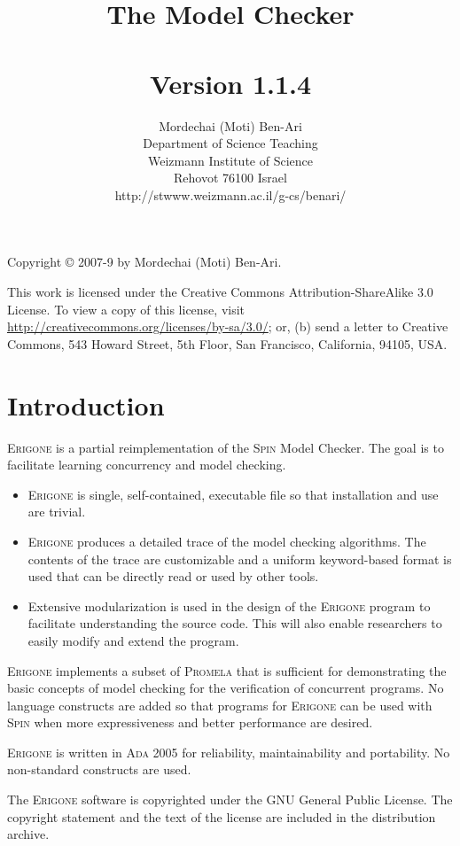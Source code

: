 \documentclass[11pt]{article}
\title{The \prg{} Model Checker\\\mbox{}\\\large{Version 1.1.4}}
\author{Mordechai (Moti) Ben-Ari\\
Department of Science Teaching\\
Weizmann Institute of Science\\
Rehovot 76100 Israel\\
\textsf{http://stwww.weizmann.ac.il/g-cs/benari/}}
\newcommand*{\prg}{\textsc{Erigone}}
\newcommand*{\spn}{\textsc{Spin}}
\newcommand*{\prm}{\textsc{Promela}}
\newcommand*{\ada}{\textsc{Ada 2005}}
\begin{document}
\maketitle
\thispagestyle{empty}

\vfill

\begin{center}
Copyright \copyright{} 2007-9 by Mordechai (Moti) Ben-Ari.
\end{center}
This work is licensed under the Creative Commons Attribution-ShareAlike 3.0
License. To view a copy of this license, visit
\url{http://creativecommons.org/licenses/by-sa/3.0/}; or, (b) send a letter
to Creative Commons, 543 Howard Street, 5th Floor, San Francisco,
California, 94105, USA.


\newpage

\section{Introduction}

\prg{} is a partial reimplementation of the \spn{} Model Checker. The goal
is to facilitate learning concurrency and model checking.
\begin{itemize}
\item \prg{} is single, self-contained, executable file so that
installation and use are trivial.
\item \prg{} produces a detailed trace of the model checking
algorithms. The contents of the trace are customizable and a uniform
keyword-based format is used that can be directly read or used by other
tools.
\item Extensive modularization is used in the design of the \prg{}
program to facilitate understanding the source code. This will also
enable researchers to easily modify and extend the program.
\end{itemize}
\prg{} implements a subset of \prm{} that is sufficient for
demonstrating the basic concepts of model checking for the verification
of concurrent programs. No language constructs are added so that
programs for \prg{} can be used with \spn{} when more expressiveness and
better performance are desired.

\prg{} is written in \ada{} for reliability, maintainability and
portability. No non-standard constructs are used.

The \prg{} software is copyrighted under the \textsc{GNU} General Public
License. The copyright statement and the text of the license are
included in the distribution archive.
\end{document}
